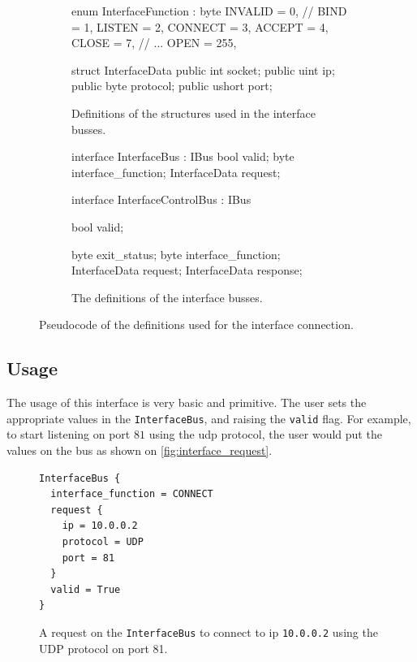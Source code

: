\begin{figure}[t]
    \centering

    \begin{subfigure}[b]{0.45\textwidth}
	\centering
\begin{mintedcsharp}
enum InterfaceFunction : byte
{
    INVALID = 0,
    // BIND = 1,
    LISTEN = 2,
    CONNECT = 3,
    ACCEPT = 4,
    CLOSE = 7,
    // ...
    OPEN = 255,
}

struct InterfaceData
{
    public int socket;
    public uint ip;
    public byte protocol;
    public ushort port;
}
\end{mintedcsharp}

        \caption{Definitions of the structures used in the interface busses.}
	\label{fig:interfacefunction_code}
    \end{subfigure}%
\hfill%
    \begin{subfigure}[b]{0.45\textwidth}
	\centering
\begin{mintedcsharp}
interface InterfaceBus : IBus
{
    bool valid;
    byte interface_function;
    InterfaceData request;
}

interface InterfaceControlBus : IBus
{
    bool valid;

    byte exit_status;
    byte interface_function;
    InterfaceData request;
    InterfaceData response;
}
\end{mintedcsharp}
	\caption{The definitions of the interface busses.\\\hfill}
	\label{fig:interfacebus_code}
    \end{subfigure}
    \caption{Pseudocode of the definitions used for the interface connection.}
	\label{fig:interface_definition}
\end{figure}




\subsection{Usage}
The usage of this interface is very basic and primitive. The user sets the
appropriate values in the \texttt{InterfaceBus}, and raising the \texttt{valid}
flag. For example, to start listening on port $81$ using the \gls{udp}
protocol, the user would put the values on the bus as shown on
\autoref{fig:interface_request}.
\begin{figure}
\centering
\begin{Verbatim}[frame=single,samepage=true]
InterfaceBus {
  interface_function = CONNECT
  request {
    ip = 10.0.0.2
    protocol = UDP
    port = 81
  }
  valid = True
}
\end{Verbatim}
	\caption{A request on the \texttt{InterfaceBus} to connect to ip
	\texttt{10.0.0.2} using the UDP protocol on port 81.}
	\label{fig:interface_request}
\end{figure}


